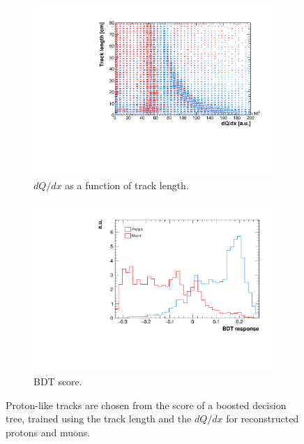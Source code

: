 \begin{figure}[htbp]
\centering
  \begin{subfigure}{0.45\textwidth}
    \includegraphics[width=\linewidth]{figures/dqdx.pdf}
    \caption{$dQ/dx$ as a function of track length.} 
  \end{subfigure}
    \begin{subfigure}{0.45\textwidth}
    \includegraphics[width=\linewidth]{figures/bdt.pdf}
    \caption{BDT score.} 
  \end{subfigure}
  \caption{Proton-like tracks are chosen from the score of a boosted decision tree, trained using the track length and the $dQ/dx$ for reconstructed protons and muons.}\label{fig:bdt}
\end{figure}

